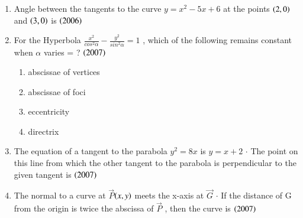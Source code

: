 \documentclass[journal,12pt,twocolumn]{IEEEtran}
\theoremstyle{remark}
\begin{document}
\begin{enumerate}
\item Angle between the tangents to the curve {$ y = x^2 -5x + 6 $} at the points {$ \left(2,0\right) $} and {$ \left(3,0\right) $} is
\hfill
\hfill{{$ \left(2006\right) $}}
\begin{enumerate}
\end{enumerate}
\hfill
\item For the Hyperbola {$ \frac{x^2}{cos^2 \alpha} - \frac{y^2}{sin^2 \alpha} = 1 $} , which of the  following remains constant when {$ \alpha $} varies = ? 
\hfill
\hfill{{$ \left(2007\right) $}}
\begin{enumerate}
\item abscissae of vertices 
\item abscissae of foci
\item eccentricity
\item directrix
\end{enumerate}
\hfill
\item The equation of a tangent to the parabola {$ y^2 = 8x $} is {$ y = x + 2 $} {$ \cdot $}  The point on this line from which the other tangent to the parabola is perpendicular to the given tangent is
\hfill 
\hfill{{$\left(2007\right)$}}
\begin{enumerate}
\end{enumerate}
\hfill
\item The normal to a curve at {$\vec{P}$}{$ \left(x, y\right) $} meets the x-axis at {$\vec{G}$} {$ \cdot $} If the distance of G from the origin is twice the abscissa of {$\vec{P}$} , then the curve is \hfill {{$ \left(2007\right) $}}
\begin{enumerate}
\end{enumerate}
\end{enumerate}
\end{document}
